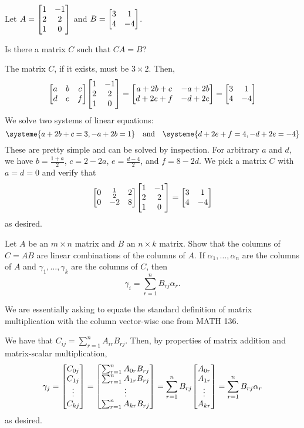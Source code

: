 \documentclass{agony}
\begin{document}
\begin{xca}
  Let $A = \mqty[1&-1\\2&2\\1&0]$ and $B = \mqty[3&1\\4&-4]$.

  Is there a matrix $C$ such that $CA = B$?
\end{xca}
\begin{sol}
  The matrix $C$, if it exists, must be $3 \times 2$. Then,
  \[ \mqty[a&b&c\\d&e&f]\mqty[1&-1\\2&2\\1&0] = \mqty[a+2b+c&-a+2b\\d+2e+f&-d+2e] = \mqty[3&1\\4&-4] \]
  We solve two systems of linear equations:
  \[ \systeme{a+2b+c=3,-a+2b=1} \qq{and} \systeme{d+2e+f=4,-d+2e=-4} \]
  These are pretty simple and can be solved by inspection.
  For arbitrary $a$ and $d$, we have $b = \frac{1+a}{2}$, $c = 2-2a$, $e = \frac{d-4}{2}$, and $f = 8-2d$.
  We pick a matrix $C$ with $a = d = 0$ and verify that
  \[ \mqty[0&\frac12&2\\0&-2&8]\mqty[1&-1\\2&2\\1&0] = \mqty[3&1\\4&-4] \]
  as desired.
\end{sol}

\begin{xca}\label{xca:vecmult}
  Let $A$ be an $m \times n$ matrix and $B$ an $n \times k$ matrix.
  Show that the columns of $C = AB$ are linear combinations of the columns of $A$.
  If $\alpha_1,\dotsc,\alpha_n$ are the columns of $A$ and $\gamma_1,\dotsc,\gamma_k$ are the columns of $C$,
  then \[ \gamma_i = \sum_{r=1}^n B_{rj}\alpha_r. \]
\end{xca}
\begin{prf}
  We are essentially asking to equate the standard definition of matrix multiplication with
  the column vector-wise one from MATH 136.

  We have that $C_{ij} = \sum_{r=1}^n A_{ir}B_{rj}$.
  Then, by properties of matrix addition and matrix-scalar multiplication,
  \begin{equation*}
    \gamma_j = \mqty[C_{0j} \\ C_{1j} \\ \vdots \\ C_{kj}]
    = \mqty[\sum_{r=1}^n A_{0r}B_{rj} \\ \sum_{r=1}^n A_{1r}B_{rj} \\ \vdots \\ \sum_{r=1}^n A_{kr}B_{rj}]
    = \sum_{r=1}^n B_{rj} \mqty[A_{0r} \\ A_{1r} \\ \vdots \\ A_{kr}]
    = \sum_{r=1}^n B_{rj} \alpha_r
  \end{equation*}
  as desired.
\end{prf}
\end{document}
